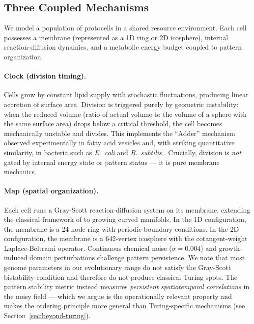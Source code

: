 \documentclass[11pt,letterpaper]{article}
\begin{document}
\subsection{Three Coupled Mechanisms}

We model a population of protocells in a shared resource environment. Each cell possesses a membrane (represented as a 1D ring or 2D icosphere), internal reaction-diffusion dynamics, and a metabolic energy budget coupled to pattern organization.

\paragraph{Clock (division timing).} Cells grow by constant lipid supply with stochastic fluctuations, producing linear accretion of surface area. Division is triggered purely by geometric instability: when the reduced volume (ratio of actual volume to the volume of a sphere with the same surface area) drops below a critical threshold, the cell becomes mechanically unstable and divides. This implements the ``Adder'' mechanism observed experimentally in fatty acid vesicles \citep{chen2004kinetic,zhu2009coupled} and, with striking quantitative similarity, in bacteria such as \emph{E.\ coli} and \emph{B.\ subtilis} \citep{campos2014constant,taheriaraghi2015cellsize,jun2015cellsize}. Crucially, division is \emph{not} gated by internal energy state or pattern status --- it is pure membrane mechanics.

\paragraph{Map (spatial organization).} Each cell runs a Gray-Scott reaction-diffusion system \citep{pearson1993complex} on its membrane, extending the classical framework of \citet{turing1952chemical} to growing curved manifolds. In the 1D configuration, the membrane is a 24-node ring with periodic boundary conditions. In the 2D configuration, the membrane is a 642-vertex icosphere with the cotangent-weight Laplace-Beltrami operator. Continuous chemical noise ($\sigma = 0.004$) and growth-induced domain perturbations challenge pattern persistence. We note that most genome parameters in our evolutionary range do not satisfy the Gray-Scott bistability condition and therefore do not produce classical Turing spots. The pattern stability metric instead measures \emph{persistent spatiotemporal correlations} in the noisy field --- which we argue is the operationally relevant property and makes the ordering principle more general than Turing-specific mechanisms (see Section~\ref{sec:beyond-turing}).
\end{document}
